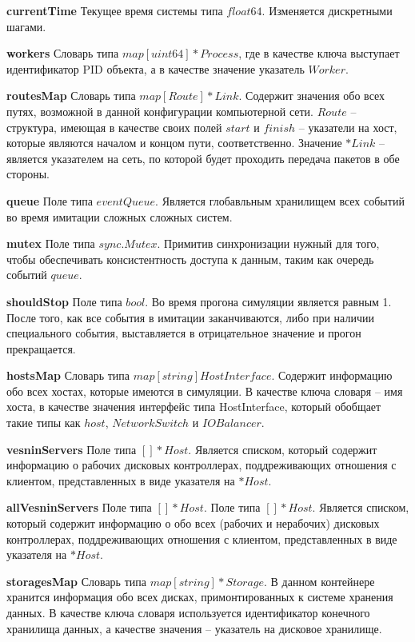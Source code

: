\textbf{currentTime}
Текущее время системы типа $float64$. Изменяется дискретными шагами.

\textbf{workers}
Словарь типа $map[uint64]*Process$, где в качестве ключа выступает идентификатор PID объекта, а в качестве значение указатель $Worker$.

\textbf{routesMap}  
Словарь типа  $map[Route]*Link$. Содержит значения обо всех путях, возможной в данной конфигурации компьютерной сети. $Route$ -- структура, имеющая в качестве своих полей $start$ и $finish$ -- указатели на хост, которые являются началом и концом пути, соответственно. Значение $*Link$ -- является указателем на сеть, по которой будет проходить передача пакетов в обе стороны.


\textbf{queue}
Поле типа $eventQueue$. Является глобавльным хранилищем всех событий во время имитации сложных сложных систем.

\textbf{mutex}         
Поле типа $sync.Mutex$. Примитив синхронизации нужный для того, чтобы обеспечивать консистентность доступа к данным, таким как очередь событий $queue$. 

\textbf{shouldStop}    
Поле типа $bool$. Во время прогона симуляции является равным 1. После того, как все события в имитации заканчиваются, либо при наличии специального события, выставляется в отрицательное значение и прогон прекращается.

\textbf{hostsMap}      
Словарь типа $map[string]HostInterface$. Содержит информацию обо всех хостах, которые имеются в симуляции. В качестве ключа словаря -- имя хоста, в качестве значения интерфейс типа HostInterface, который обобщает такие типы как $host$, $NetworkSwitch$ и $IOBalancer$.

\textbf{vesninServers}
Поле типа $[]*Host$. Является списком, который содержит информацию о рабочих дисковых контроллерах, поддреживающих отношения с клиентом, представленных в виде указателя на $*Host$.

\textbf{allVesninServers}
Поле типа $[]*Host$. Поле типа $[]*Host$. Является списком, который содержит информацию о обо всех (рабочих и нерабочих) дисковых контроллерах, поддреживающих отношения с клиентом, представленных в виде указателя на $*Host$.

\textbf{storagesMap}   
Словарь типа $map[string]*Storage$. В данном контейнере хранится информация обо всех дисках, примонтированных к системе хранения данных. В качестве ключа словаря используется идентификатор конечного хранилища данных, а качестве значения -- указатель на дисковое хранилище.

